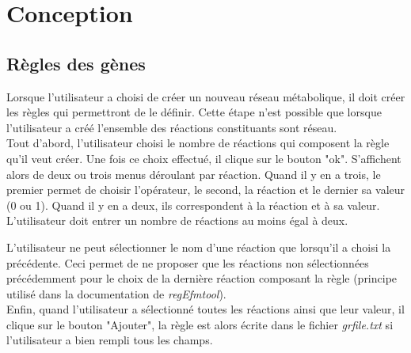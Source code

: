 \chapter{Conception}

\section{Règles des gènes}
Lorsque l'utilisateur a choisi de créer un nouveau réseau métabolique, il doit créer les règles qui permettront de le définir. Cette étape n'est possible que lorsque l'utilisateur a créé l'ensemble des réactions constituants sont réseau.\\

Tout d'abord, l'utilisateur choisi le nombre de réactions qui composent la règle qu'il veut créer.
Une fois ce choix effectué, il clique sur le bouton "ok". S'affichent alors de deux ou trois menus déroulant par réaction. Quand il y en a trois, le premier permet de choisir l'opérateur, le second, la réaction et le dernier sa valeur (0 ou 1). Quand il y en a deux, ils correspondent à la réaction et à sa valeur. L'utilisateur doit entrer un nombre de réactions au moins égal à deux.

L'utilisateur ne peut sélectionner le nom d'une réaction que lorsqu'il a choisi la précédente. Ceci permet de ne proposer que les réactions non sélectionnées précédemment pour le choix de la dernière réaction composant la règle (principe utilisé dans la documentation de \emph{regEfmtool}).\\

Enfin, quand l'utilisateur a sélectionné toutes les réactions ainsi que leur valeur, il clique sur le bouton "Ajouter", la règle est alors écrite dans le fichier \emph{grfile.txt} si l'utilisateur a bien rempli tous les champs.